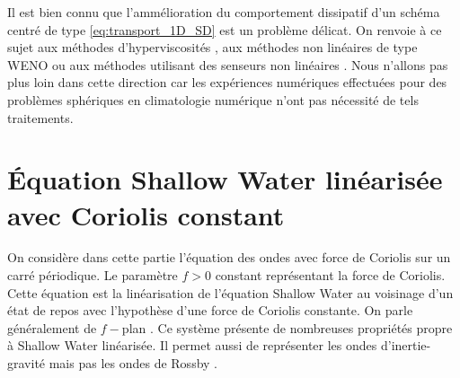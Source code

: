 Il est bien connu que l'ammélioration du comportement dissipatif d'un schéma centré de type \eqref{eq:transport_1D_SD} est un problème délicat. On renvoie à ce sujet aux méthodes d'hyperviscosités \cite{Cook2005}, aux méthodes non linéaires de type WENO \cite{Qiu2002} ou aux méthodes utilisant des senseurs non linéaires \cite{Yee1989}. Nous n'allons pas plus loin dans cette direction car les expériences numériques effectuées pour des problèmes sphériques en climatologie numérique n'ont pas nécessité de tels traitements.














































\section{Équation Shallow Water linéarisée avec Coriolis constant}

On considère dans cette partie l'équation des ondes avec force de Coriolis sur un carré périodique. Le paramètre $f > 0$ constant représentant la force de Coriolis. Cette équation est la linéarisation de l'équation Shallow Water au voisinage d'un état de repos avec l'hypothèse d'une force de Coriolis constante. On parle généralement de $f-$plan \cite{Blayo2000}. Ce système présente de nombreuses propriétés propre à Shallow Water linéarisée. Il permet aussi de représenter les ondes d'inertie-gravité mais pas les ondes de Rossby \cite{Blayo2000,Golshahy2011}.

